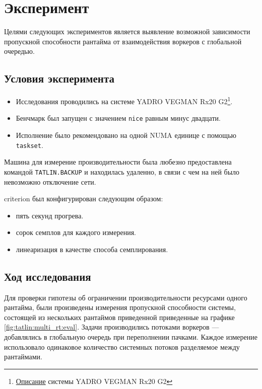 
\section{Эксперимент}

Целями следующих экспериментов является выявление возможной зависимости пропускной способности рантайма от взаимодействия воркеров с глобальной очередью.

\subsection{Условия эксперимента}

\begin{itemize}
    \item Исследования проводились на системе YADRO VEGMAN Rx20 G2\footnote{\href{https://yadro.com/ru/vegman/rx20g2/specs}{Описание} системы YADRO VEGMAN Rx20 G2}.
    \item Бенчмарк был запущен с значением \verb|nice| равным минус двадцати.
    \item Исполнение было рекомендовано на одной NUMA единице с помощью \verb|taskset|.
\end{itemize}

Машина для измерение производительности была любезно предоставлена командой \verb|TATLIN.BACKUP| и находилась удаленно, в связи с чем на ней было невозможно отключение сети.

criterion был конфигурирован следующим образом:

\begin{itemize}
    \item пять секунд прогрева.
    \item сорок семплов для каждого измерения.
    \item линеаризация в качестве способа семплирования.
\end{itemize}

\subsection{Ход исследования}

Для проверки гипотезы об ограничении производительности ресурсами одного рантайма, были произведены измерения пропускной способности системы, состоящей из нескольких рантаймов приведенной приведенные на графике \ref{fig:tatlin:multi_rt:eval}. Задачи производились потоками воркеров --- добавлялись в глобальную очередь при переполнении пачками. Каждое измерение использовало одинаковое количество системных потоков разделяемое между рантаймами.

